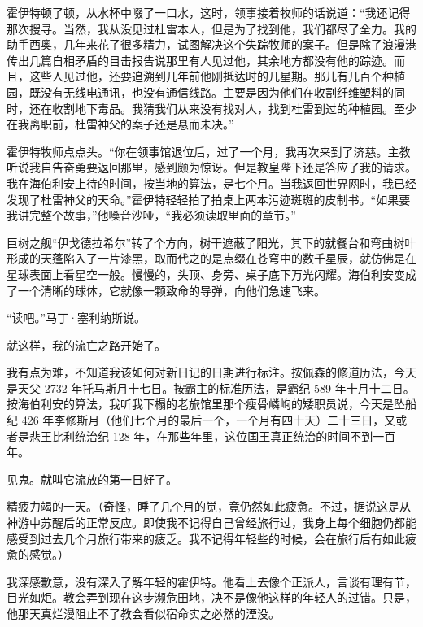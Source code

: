 \documentclass[AutoFakeBold=true]{book}
\begin{document}
霍伊特顿了顿，从水杯中啜了一口水，这时，领事接着牧师的话说道：``我还记得那次搜寻。当然，我从没见过杜雷本人，但是为了找到他，我们都尽了全力。我的助手西奥，几年来花了很多精力，试图解决这个失踪牧师的案子。但是除了浪漫港传出几篇自相矛盾的目击报告说那里有人见过他，其余地方都没有他的踪迹。而且，这些人见过他，还要追溯到几年前他刚抵达时的几星期。那儿有几百个种植园，既没有无线电通讯，也没有通信线路。主要是因为他们在收割纤维塑料的同时，还在收割地下毒品。我猜我们从来没有找对人，找到杜雷到过的种植园。至少在我离职前，杜雷神父的案子还是悬而未决。''

霍伊特牧师点点头。``你在领事馆退位后，过了一个月，我再次来到了济慈。主教听说我自告奋勇要返回那里，感到颇为惊讶。但是教皇陛下还是答应了我的请求。我在海伯利安上待的时间，按当地的算法，是七个月。当我返回世界网时，我已经发现了杜雷神父的天命。''霍伊特轻轻拍了拍桌上两本污迹斑斑的皮制书。``如果要我讲完整个故事，''他嗓音沙哑，``我必须读取里面的章节。''

巨树之舰``伊戈德拉希尔''转了个方向，树干遮蔽了阳光，其下的就餐台和弯曲树叶形成的天蓬陷入了一片漆黑，取而代之的是点缀在苍穹中的数千星辰，就仿佛是在星球表面上看星空一般。慢慢的，头顶、身旁、桌子底下万光闪耀。海伯利安变成了一个清晰的球体，它就像一颗致命的导弹，向他们急速飞来。

``读吧。''马丁·塞利纳斯说。

\vspace*{1em}


\vspace*{1em}{\kaishu 第一日：}

就这样，我的流亡之路开始了。

我有点为难，不知道我该如何对新日记的日期进行标注。按佩森的修道历法，今天是天父 2732 年托马斯月十七日。按霸主的标准历法，是霸纪 589 年十月十二日。按海伯利安的算法，我听我下榻的老旅馆里那个瘦骨嶙峋的矮职员说，今天是坠船纪 426 年李修斯月（他们七个月的最后一个，一个月有四十天）二十三日，又或者是悲王比利统治纪 128 年，在那些年里，这位国王真正统治的时间不到一百年。

见鬼。就叫它流放的第一日好了。

精疲力竭的一天。（奇怪，睡了几个月的觉，竟仍然如此疲惫。不过，据说这是从神游中苏醒后的正常反应。即使我不记得自己曾经旅行过，我身上每个细胞仍都能感受到过去几个月旅行带来的疲乏。我不记得年轻些的时候，会在旅行后有如此疲惫的感觉。）

我深感歉意，没有深入了解年轻的霍伊特。他看上去像个正派人，言谈有理有节，目光如炬。教会弄到现在这步濒危田地，决不是像他这样的年轻人的过错。只是，他那天真烂漫阻止不了教会看似宿命实之必然的湮没。
\end{document}
